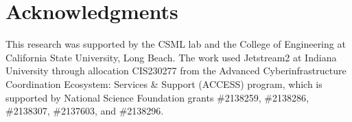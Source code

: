 \section*{Acknowledgments}

This research was supported by the CSML lab and the College of Engineering at
California State University, Long Beach. The work used Jetstream2 at Indiana
University through allocation CIS230277 from the Advanced
Cyberinfrastructure Coordination Ecosystem: Services \& Support (ACCESS)
program, which is supported by National Science Foundation grants \#2138259,
\#2138286, \#2138307, \#2137603, and \#2138296.
